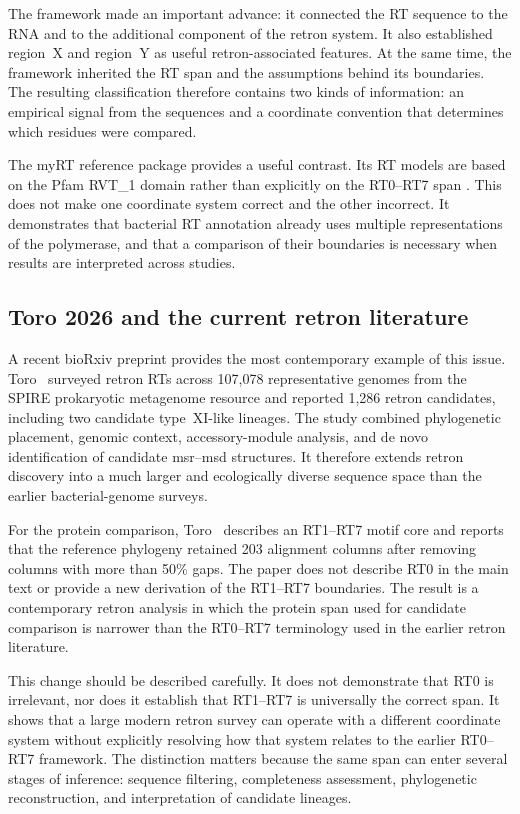 The framework made an important advance: it connected the RT sequence to the
RNA and to the additional component of the retron system. It also established
region~X and region~Y as useful retron-associated features. At the same time,
the framework inherited the RT span and the assumptions behind its boundaries.
The resulting classification therefore contains two kinds of information: an
empirical signal from the sequences and a coordinate convention that determines
which residues were compared.

The myRT reference package provides a useful contrast. Its RT models are based
on the Pfam RVT\_1 domain rather than explicitly on the RT0--RT7 span
\cite{sharifi2022}. This does not make one coordinate system correct and the
other incorrect. It demonstrates that bacterial RT annotation already uses
multiple representations of the polymerase, and that a comparison of their
boundaries is necessary when results are interpreted across studies.

\subsection{Toro 2026 and the current retron literature}

A recent bioRxiv preprint provides the most contemporary example of this
issue. Toro~\cite{toro2026} surveyed retron RTs across 107{,}078 representative
genomes from the SPIRE prokaryotic metagenome resource and reported 1{,}286
retron candidates, including two candidate type~XI-like lineages. The study
combined phylogenetic placement, genomic context, accessory-module analysis,
and de novo identification of candidate msr--msd structures. It therefore
extends retron discovery into a much larger and ecologically diverse sequence
space than the earlier bacterial-genome surveys.

For the protein comparison, Toro~\cite{toro2026} describes an RT1--RT7 motif
core and reports that the reference phylogeny retained 203 alignment columns
after removing columns with more than 50\% gaps. The paper does not describe
RT0 in the main text or provide a new derivation of the RT1--RT7 boundaries.
The result is a contemporary retron analysis in which the protein span used
for candidate comparison is narrower than the RT0--RT7 terminology used in
the earlier retron literature.

This change should be described carefully. It does not demonstrate that RT0 is
irrelevant, nor does it establish that RT1--RT7 is universally the correct
span. It shows that a large modern retron survey can operate with a different
coordinate system without explicitly resolving how that system relates to the
earlier RT0--RT7 framework. The distinction matters because the same span can
enter several stages of inference: sequence filtering, completeness assessment,
phylogenetic reconstruction, and interpretation of candidate lineages.

